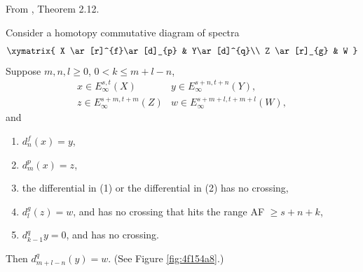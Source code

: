\begin{theorem}
\label{paper:2.12}
From \cite{LWX126}, Theorem 2.12.\par
\label{thm:4114f70c}
    Consider a homotopy commutative diagram of spectra
    $$\xymatrix{
    X \ar[r]^{f}\ar[d]_{p} & Y\ar[d]^{q}\\
    Z \ar[r]_{g} & W
    }$$
    Suppose $m,n,l\ge 0$, $0<k\le m+l-n$,
    $$\begin{array}{ll}
        x\in E^{s,t}_\infty(X) & y\in E^{s+n,t+n}_\infty(Y),\\
        z\in E^{s+m,t+m}_\infty(Z) & w\in E^{s+m+l,t+m+l}_\infty(W),
    \end{array}$$
    and
    \begin{enumerate}
        \item $d^{f}_{n}(x)=y$,
        \item $d^{p}_{m}(x)=z$,
        \item the differential in (1) or the differential in (2) has no crossing,
        \item $d^{g}_{l}(z)=w$, and has no crossing that hits the range AF $\ge s+n+k$,
        \item $d^{q}_{k-1} y=0$, and has no crossing.
    \end{enumerate}
    Then $d^{q}_{m+l-n}(y)=w$. (See Figure \ref{fig:4f154a8}.)

\end{theorem}
